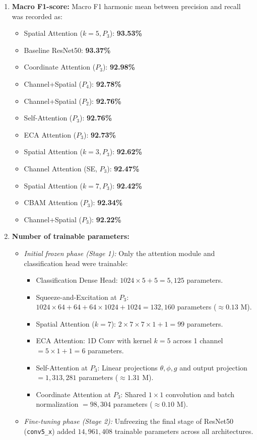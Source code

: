 \documentclass[10pt]{article}
\begin{document}
\begin{enumerate}
\item \textbf{Macro F1-score:}
Macro F1 harmonic mean between precision and recall was recorded as:
\begin{itemize}
\item Spatial Attention ($k=5, P_3$): \textbf{93.53\%}
\item Baseline ResNet50: \textbf{93.37\%}
\item Coordinate Attention ($P_3$): \textbf{92.98\%}
\item Channel+Spatial ($P_4$): \textbf{92.78\%}
\item Channel+Spatial ($P_2$): \textbf{92.76\%}
\item Self-Attention ($P_3$): \textbf{92.76\%}
\item ECA Attention ($P_3$): \textbf{92.73\%}
\item Spatial Attention ($k=3, P_3$): \textbf{92.62\%}
\item Channel Attention (SE, $P_3$): \textbf{92.47\%}
\item Spatial Attention ($k=7, P_3$): \textbf{92.42\%}
\item CBAM Attention ($P_3$): \textbf{92.34\%}
\item Channel+Spatial ($P_3$): \textbf{92.22\%}
\end{itemize}

\item \textbf{Number of trainable parameters:}
\begin{itemize}
\item \textit{Initial frozen phase (Stage 1):} Only the attention module and classification head were trainable:
  \begin{itemize}
  \item Classification Dense Head: $1024 \times 5 + 5 = 5,125$ parameters.
  \item Squeeze-and-Excitation at $P_3$: $1024 \times 64 + 64 + 64 \times 1024 + 1024 = 132,160$ parameters ($\approx 0.13\text{ M}$).
  \item Spatial Attention ($k=7$): $2 \times 7 \times 7 \times 1 + 1 = 99$ parameters.
  \item ECA Attention: 1D Conv with kernel $k=5$ across 1 channel $= 5 \times 1 + 1 = 6$ parameters.
  \item Self-Attention at $P_3$: Linear projections $\theta, \phi, g$ and output projection $= 1,313,281$ parameters ($\approx 1.31\text{ M}$).
  \item Coordinate Attention at $P_3$: Shared $1\times1$ convolution and batch normalization $= 98,304$ parameters ($\approx 0.10\text{ M}$).
  \end{itemize}
\item \textit{Fine-tuning phase (Stage 2):} Unfreezing the final stage of ResNet50 (\texttt{conv5\_x}) added $14,961,408$ trainable parameters across all architectures.
\end{itemize}


\end{enumerate}
\end{document}
